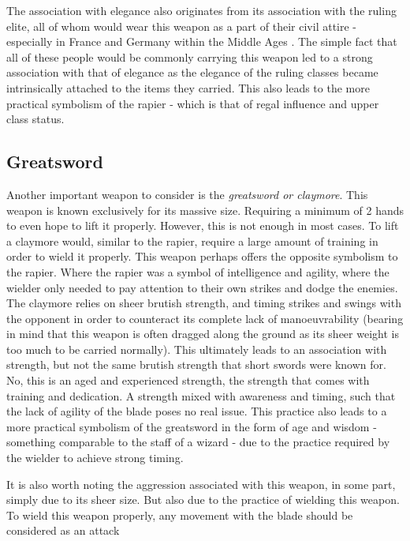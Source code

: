 \documentclass{article}
\begin{document}
The association with elegance also originates from its association with the ruling elite, all of whom would wear this weapon as a part of their civil attire - especially in France and Germany within the Middle Ages \parencite{correa2013history}. The simple fact that all of these people would be commonly carrying this weapon led to a strong association with that of elegance as the elegance of the ruling classes became intrinsically attached to the items they carried. This also leads to the more practical symbolism of the rapier - which is that of regal influence and upper class status.

\subsection{Greatsword} \label{greatswordSymbol}
Another important weapon to consider is the \emph{greatsword or claymore}. This weapon is known exclusively for its massive size. Requiring a minimum of 2 hands to even hope to lift it properly. However, this is not enough in most cases. To lift a claymore would, similar to the rapier, require a large amount of training in order to wield it properly. This weapon perhaps offers the opposite symbolism to the rapier. Where the rapier was a symbol of intelligence and agility, where the wielder only needed to pay attention to their own strikes and dodge the enemies. The claymore relies on sheer brutish strength, and timing strikes and swings with the opponent in order to counteract its complete lack of manoeuvrability (bearing in mind that this weapon is often dragged along the ground as its sheer weight is too much to be carried normally). This ultimately leads to an association with strength, but not the same brutish strength that short swords were known for. No, this is an aged and experienced strength, the strength that comes with training and dedication. A strength mixed with awareness and timing, such that the lack of agility of the blade poses no real issue. This practice also leads to a more practical symbolism of the greatsword in the form of age and wisdom - something comparable to the staff of a wizard - due to the practice required by the wielder to achieve strong timing.

It is also worth noting the aggression associated with this weapon, in some part, simply due to its sheer size. But also due to the practice of wielding this weapon. To wield this weapon properly, any movement with the blade should be considered as an attack


\pagebreak


\printbibliography
\end{document}
